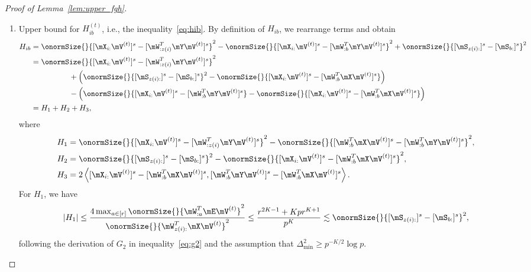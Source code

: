 \documentclass[lettersize,onecolumn,journal]{IEEEtran}
\theoremstyle{definition}
\theoremstyle{definition}
\newcommand{\of}[1]{\left(#1\right)}
\newcommand{\ang}[1]{\left\langle#1\right\rangle}
\begin{document}
\begin{proof}[Proof of Lemma~\ref{lem:upper_fgh}]
\begin{enumerate}[wide]
    Plugging the inequalities~\eqref{eq:g1}, \eqref{eq:g2}, and \eqref{eq:g3} into the upper bound~\eqref{eq:gib_decomp}, we finish the proof of inequality~\eqref{eq:gib}.    
    \item Upper bound for $H_{ib}^{(t)}$, i.e., the inequality~\eqref{eq:hib}. By definition of $H_{ib}$, we rearrange terms and obtain
    \begin{align}
        H_{ib} &= \onormSize{}{ [\mX_{i:} \mV^{(t)}]^s -  [  \mW_{:z(i)}^T \mY \mV^{(t)} ]^s}^2 - \onormSize{}{ [\mX_{i:} \mV^{(t)}]^s -  [  \mW_{:b}^T \mY \mV^{(t)} ]^s}^2 + \onormSize{}{ [ \mS_{z(i):}  ]^s - [ \mS_{b:}  ]^s  }^2 \\
        & =  \onormSize{}{ [ \mX_{i:} \mV^{(t)}]^s -  [  \mW_{:z(i)}^T \mY \mV^{(t)} ]^s}^2 \\
        & \quad \quad \quad \quad \quad + \of{ \onormSize{}{ [ \mS_{z(i):}  ]^s - [ \mS_{b:}  ]^s  }^2 - \onormSize{}{ [\mX_{i:} \mV^{(t)}]^s-  [  \mW_{:b}^T \mX \mV^{(t)} ]^s }  } \\
        & \quad \quad \quad \quad \quad  - \of{\onormSize{}{ [\mX_{i:} \mV^{(t)}]^s-  [  \mW_{:b}^T \mY \mV^{(t)} ]^s } -  \onormSize{}{ [\mX_{i:} \mV^{(t)}]^s-  [  \mW_{:b}^T \mX \mV^{(t)} ]^s }   } \\
        & = H_1 + H_2 + H_3,
    \end{align}
    where 
    \begin{align}
        H_1 &= \onormSize{}{ [ \mX_{i:} \mV^{(t)}]^s -  [  \mW_{:z(i)}^T \mY \mV^{(t)} ]^s}^2 - \onormSize{}{ [ \mW_{:b}^T \mX \mV^{(t)}]^s -  [ \mW_{:b}^T \mY \mV^{(t)}]^s}^2, \\
        H_2 &=  \onormSize{}{ [ \mS_{z(i):}  ]^s - [ \mS_{b:}  ]^s  }^2 - \onormSize{}{ [\mX_{i:} \mV^{(t)}]^s-  [  \mW_{:b}^T \mX \mV^{(t)} ]^s }^2  , \\
        H_3 & = 2 \ang{  [\mX_{i:} \mV^{(t)}]^s  -  [  \mW_{:b}^T \mX \mV^{(t)} ]^s,  [  \mW_{:b}^T \mY \mV^{(t)} ]^s -  [  \mW_{:b}^T \mX \mV^{(t)} ]^s }.
    \end{align}
    For $H_1$, we have 
    \begin{align}
        |H_1| \leq  \frac{4 \max_{a \in [r]}\onormSize{}{ \mW_{:a}^T \mE \mV^{(t)} }^2 }{ \onormSize{}{ \mW_{z(i):}^T\mX \mV^{(t)}}^2}
         \leq  \frac{ r^{2K-1} + K p r^{K+1} }{p^{K}} 
        \lesssim  \onormSize{}{ [ \mS_{z(i):}  ]^s - [ \mS_{b:}  ]^s  }^2\label{eq:h1},
    \end{align}
    following the derivation of $G_2$ in inequality~\eqref{eq:g2} and the assumption that $\Delta_{\min}^2 \geq p^{-K/2} \log p$.


\end{enumerate}
\end{proof}
\end{document}
